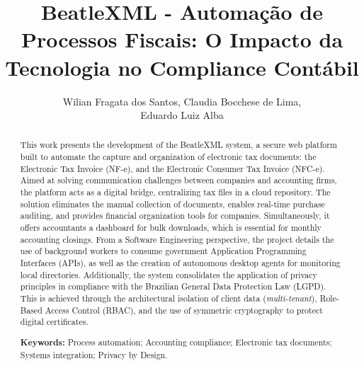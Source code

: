 \documentclass[12pt]{article}
\title{BeatleXML - Automação de Processos Fiscais: O Impacto da Tecnologia no Compliance Contábil}
\author{Wilian Fragata dos Santos\inst{1}, Claudia Bocchese de Lima\inst{1}, \\ Eduardo Luiz Alba\inst{1}}
\begin{document}
\maketitle


\begin{abstract}
This work presents the development of the BeatleXML system, a secure web platform built to automate the capture and organization of electronic tax documents: the Electronic Tax Invoice (NF-e), and the Electronic Consumer Tax Invoice (NFC-e). Aimed at solving communication challenges between companies and accounting firms, the platform acts as a digital bridge, centralizing tax files in a cloud repository. The solution eliminates the manual collection of documents, enables real-time purchase auditing, and provides financial organization tools for companies. Simultaneously, it offers accountants a dashboard for bulk downloads, which is essential for monthly accounting closings. From a Software Engineering perspective, the project details the use of background workers to consume government Application Programming Interfaces (APIs), as well as the creation of autonomous desktop agents for monitoring local directories. Additionally, the system consolidates the application of privacy principles in compliance with the Brazilian General Data Protection Law (LGPD). This is achieved through the architectural isolation of client data (\textit{multi-tenant}), Role-Based Access Control (RBAC), and the use of symmetric cryptography to protect digital certificates.

\textbf{Keywords:} Process automation; Accounting compliance; Electronic tax documents; Systems integration; Privacy by Design.
\end{abstract}
\end{document}
